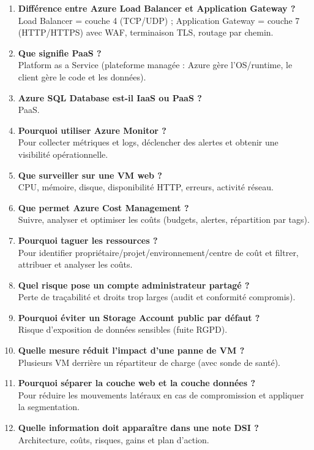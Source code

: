 \documentclass[11pt,a4paper]{article}
\begin{document}
\begin{enumerate}[leftmargin=2.2em]
\item \textbf{Différence entre Azure Load Balancer et Application Gateway ?}\\ Load Balancer = couche 4 (TCP/UDP) ; Application Gateway = couche 7 (HTTP/HTTPS) avec WAF, terminaison TLS, routage par chemin.
\item \textbf{Que signifie PaaS ?}\\ Platform as a Service (plateforme managée : Azure gère l'OS/runtime, le client gère le code et les données).
\item \textbf{Azure SQL Database est-il IaaS ou PaaS ?}\\ PaaS.
\item \textbf{Pourquoi utiliser Azure Monitor ?}\\ Pour collecter métriques et logs, déclencher des alertes et obtenir une visibilité opérationnelle.
\item \textbf{Que surveiller sur une VM web ?}\\ CPU, mémoire, disque, disponibilité HTTP, erreurs, activité réseau.
\item \textbf{Que permet Azure Cost Management ?}\\ Suivre, analyser et optimiser les coûts (budgets, alertes, répartition par tags).
\item \textbf{Pourquoi taguer les ressources ?}\\ Pour identifier propriétaire/projet/environnement/centre de coût et filtrer, attribuer et analyser les coûts.
\item \textbf{Quel risque pose un compte administrateur partagé ?}\\ Perte de traçabilité et droits trop larges (audit et conformité compromis).
\item \textbf{Pourquoi éviter un Storage Account public par défaut ?}\\ Risque d'exposition de données sensibles (fuite RGPD).
\item \textbf{Quelle mesure réduit l'impact d'une panne de VM ?}\\ Plusieurs VM derrière un répartiteur de charge (avec sonde de santé).
\item \textbf{Pourquoi séparer la couche web et la couche données ?}\\ Pour réduire les mouvements latéraux en cas de compromission et appliquer la segmentation.
\item \textbf{Quelle information doit apparaître dans une note DSI ?}\\ Architecture, coûts, risques, gains et plan d'action.

\end{enumerate}
\end{document}
